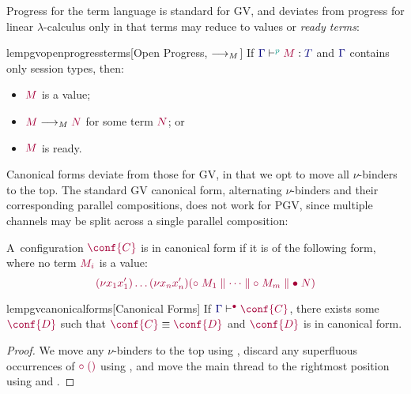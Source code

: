 \documentclass[main.tex]{subfiles}
\begin{document}
Progress for the term language is standard for GV, and deviates from progress for linear $\lambda$-calculus only in that terms may reduce to values or \emph{ready terms}:
\begin{restatablelemma}{lempgvopenprogressterms}[Open Progress, $\longrightarrow_{M}$]
  \label{lem:pgv-open-progress-terms}
  If $\tseq[\cs{p}]{\ty{\Gamma}}{M}{T}$ and $\ty{\Gamma}$ contains only session types, then:
  \begin{itemize}
  \item $\tm{M}$ is a value;
  \item $\tm{M}\tred\tm{N}$ for some term $\tm{N}$; or
  \item $\tm{M}$ is ready.
  \end{itemize}
\end{restatablelemma}

Canonical forms deviate from those for GV, in that we opt to move all $\nu$-binders to the top. The standard GV canonical form, alternating $\nu$-binders and their corresponding parallel compositions, does not work for PGV, since multiple channels may be split across a single parallel composition:
\begin{definition}
  \label{def:pgv-canonical-forms}
  A~configuration $\tm{\conf{C}}$ is in canonical form if it is of the following form, where no term $\tm{M_i}$ is a value:
  \[
    \tm{\res{x_1}{x'_1}{\dots\res{x_n}{x'_n}{(\child\;M_1\parallel\dots\parallel\child\;M_m\parallel\main\;N)}}}
  \]
\end{definition}
\begin{restatablelemma}{lempgvcanonicalforms}[Canonical Forms]
  \label{lem:pgv-canonical-forms}
  If $\cseq[\main]{\ty{\Gamma}}{\conf{C}}$, there exists some $\tm{\conf{D}}$ such that $\tm{\conf{C}}\equiv\tm{\conf{D}}$ and $\tm{\conf{D}}$ is in canonical form.
\end{restatablelemma}
\begin{proof}
  We move any $\nu$-binders to the top using , discard any superfluous occurrences of $\tm{\child\;\unit}$ using , and move the main thread to the rightmost position using  and .
\end{proof}
\end{document}
